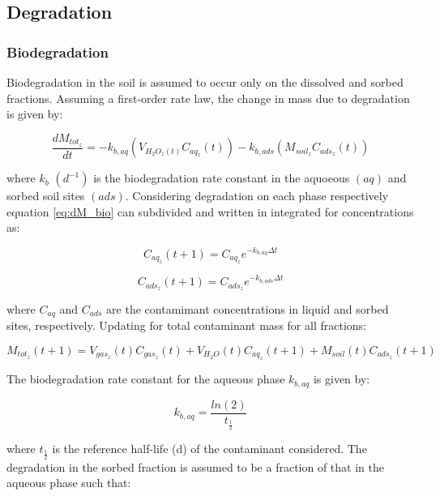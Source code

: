 \documentclass[]{article}
\begin{document}
\hypertarget{degradation}{%
\subsection{Degradation}\label{degradation}}

\hypertarget{biodegradation}{%
\subsubsection{Biodegradation}\label{biodegradation}}

Biodegradation in the soil is assumed to occur only on the dissolved and
sorbed fractions. Assuming a first-order rate law, the change in mass
due to degradation is given by:

\begin{equation}
\frac{dM_{tot_z}}{dt} = -k_{b,aq}(V_{H_2O_z(t)}C_{aq_z}(t))-k_{b,ads}(M_{soil_z}C_{ads_z}(t))
\label{eq:dM_bio}
\end{equation}

where \(k_{b}\) \((d^{-1})\) is the biodegradation rate constant in the
aquoeous \((aq)\) and sorbed soil sites \((ads)\). Considering
degradation on each phase respectively equation \ref{eq:dM_bio} can
subdivided and written in integrated for concentrations as:

\begin{equation}
C_{aq_z}(t+1) = C_{aq_z}e^{-k_{b,aq} \Delta t} 
\label{eq:Maq_t1}
\end{equation}

\begin{equation}
C_{ads_z}(t+1) = C_{ads_z}e^{-k_{b,ads} \Delta t}
\label{eq:Mads_t1}
\end{equation}

where \(C_{aq}\) and \(C_{ads}\) are the contamimant concentrations in
liquid and sorbed sites, respectively. Updating for total contaminant
mass for all fractions:

\begin{equation}
M_{tot_z}(t+1) = V_{gas_z}(t)C_{gas_z}(t) + V_{H_2O}(t)C_{aq_z}(t+1) + M_{soil}(t)C_{ads_z}(t+1)
\label{eq:Mtot_t1}
\end{equation}

The biodegradation rate constant for the aqueous phase \(k_{b,aq}\) is
given by:

\begin{equation}
k_{b,aq} = \frac{ln(2)}{t_\frac{1}{2}} 
\label{eq:k_b}
\end{equation}

where \(t_\frac{1}{2}\) is the reference half-life (d) of the
contaminant considered. The degradation in the sorbed fraction is
assumed to be a fraction of that in the aqueous phase such that:
\end{document}
